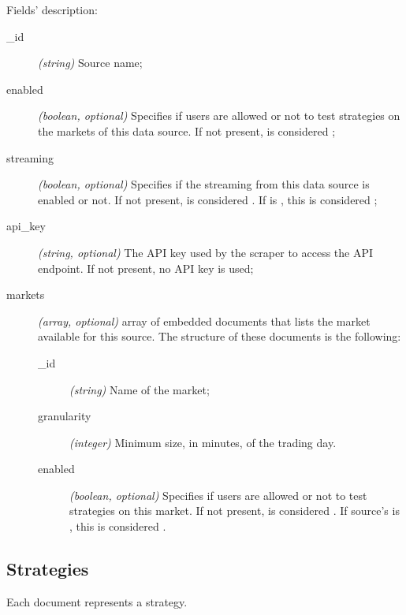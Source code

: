 Fields' description:
\begin{description}
	\item[\_id] \textit{(string)} Source name;
	\item[enabled] \textit{(boolean, optional)} Specifies if users are
		allowed or not to test strategies on the markets of this data
		source. If not present, is considered ;
	\item[streaming] \textit{(boolean, optional)} Specifies if the streaming
		from this data source is enabled or not. If not present, is
		considered . If  is , this
		is considered ;
	\item[api\_key] \textit{(string, optional)} The API key used by the
		scraper to access the API endpoint. If not present, no API key
		is used;
	\item[markets] \textit{(array, optional)} array of embedded documents
		that lists the market available for this source. The structure
		of these documents is the following:
		\begin{description}
			\item[\_id] \textit{(string)} Name of the market;
			\item[granularity] \textit{(integer)} Minimum size,
				in minutes, of the trading day.
			\item[enabled] \textit{(boolean, optional)} Specifies if
				users are allowed or not to test strategies on
				this market. If not present, is considered
				. If source's  is
				, this is considered .
		\end{description}
\end{description}

\subsection{Strategies}



Each document represents a strategy.

